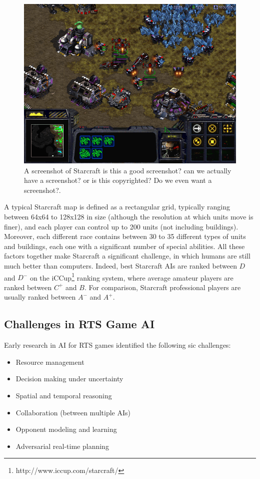 \documentclass[journal]{IEEEtran}
\begin{document}
\begin{figure}
    \centering
    \includegraphics[width=0.8\columnwidth]{figures/starcraft1.png}
    \caption{A screenshot of Starcraft {\color{red} is this a good screenshot? can we actually have a screenshot? or is this copyrighted? Do we even want a screenshot?}.}
    \label{fig:starcraft}
\end{figure}

A typical Starcraft map is defined as a rectangular grid,
typically  ranging between 64x64  to 128x128  in size  (although the
resolution  at which  units  move  is finer),  and  each player  can
control up  to 200 units (not including  buildings).  Moreover, each
different race  contains between 30  to 35 different types  of units
and  buildings,  each  one  with  a significant  number  of  special
abilities. All these factors  together make Starcraft a significant
challenge,   in   which   humans    are   still   much   better   than
computers. Indeed, best Starcraft AIs are ranked between $D$ and $D^-$
on the iCCup\footnote{http://www.iccup.com/starcraft/} ranking system,
where average  amateur players are  ranked between $C^+$ and  $B$. For
comparison, Starcraft professional  players are usually ranked between
$A^-$ and $A^+$.

\subsection{Challenges in RTS Game AI}\label{subsec:challenges}

Early research in AI for RTS games \cite{Buro03rts} identified the following sic challenges: 
\begin{itemize}
\item Resource management
\item Decision making under uncertainty
\item Spatial and temporal reasoning
\item Collaboration (between multiple AIs)
\item Opponent modeling and learning
\item Adversarial real-time planning
\end{itemize}
\end{document}
